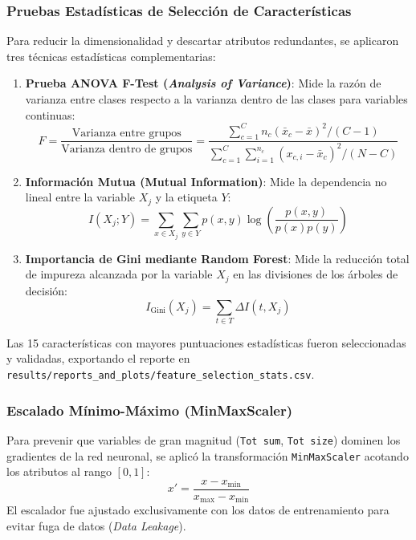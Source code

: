 \subsubsection{Pruebas Estadísticas de Selección de Características}
Para reducir la dimensionalidad y descartar atributos redundantes, se aplicaron tres técnicas estadísticas complementarias:

\begin{enumerate}[leftmargin=*]
    \item \textbf{Prueba ANOVA F-Test (\textit{Analysis of Variance})}: Mide la razón de varianza entre clases respecto a la varianza dentro de las clases para variables continuas:
    \begin{equation}
    F = \frac{\text{Varianza entre grupos}}{\text{Varianza dentro de grupos}} = \frac{\sum_{c=1}^C n_c (\bar{x}_c - \bar{x})^2 / (C - 1)}{\sum_{c=1}^C \sum_{i=1}^{n_c} (x_{c,i} - \bar{x}_c)^2 / (N - C)}
    \end{equation}
    \item \textbf{Información Mutua (Mutual Information)}: Mide la dependencia no lineal entre la variable $X_j$ y la etiqueta $Y$:
    \begin{equation}
    I(X_j; Y) = \sum_{x \in X_j} \sum_{y \in Y} p(x, y) \log \left( \frac{p(x, y)}{p(x)p(y)} \right)
    \end{equation}
    \item \textbf{Importancia de Gini mediante Random Forest}: Mide la reducción total de impureza alcanzada por la variable $X_j$ en las divisiones de los árboles de decisión:
    \begin{equation}
    I_{\text{Gini}}(X_j) = \sum_{t \in T} \Delta I(t, X_j)
    \end{equation}
\end{enumerate}

Las 15 características con mayores puntuaciones estadísticas fueron seleccionadas y validadas, exportando el reporte en \texttt{results/reports\_and\_plots/feature\_selection\_stats.csv}.

\subsubsection{Escalado Mínimo-Máximo (MinMaxScaler)}
Para prevenir que variables de gran magnitud (\texttt{Tot sum}, \texttt{Tot size}) dominen los gradientes de la red neuronal, se aplicó la transformación \texttt{MinMaxScaler} acotando los atributos al rango $[0, 1]$:
\begin{equation}
x' = \frac{x - x_{\min}}{x_{\max} - x_{\min}}
\end{equation}
El escalador fue ajustado exclusivamente con los datos de entrenamiento para evitar fuga de datos (\textit{Data Leakage}).


